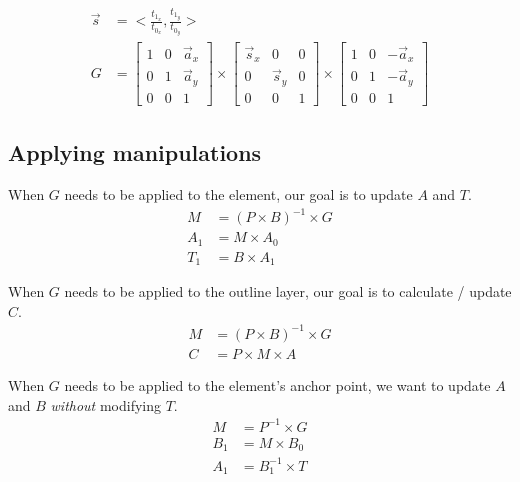 \documentclass[12pt]{article}
\begin{document}
\begin{itemize}
\begin{align}
      \vec s &= <\frac{t_1_x}{t_0_x},\frac{t_1_y}{t_0_y}> \\
      G &= \begin{bmatrix}
        1 & 0 & \vec a_x\\
        0 & 1 & \vec a_y\\
        0 & 0 & 1
      \end{bmatrix} \times
      \begin{bmatrix}
        \vec s_x & 0 & 0\\
        0 & \vec s_y & 0\\
        0 & 0 & 1
      \end{bmatrix} \times
      \begin{bmatrix}
        1 & 0 & -\vec a_x\\
        0 & 1 & -\vec a_y\\
        0 & 0 & 1
      \end{bmatrix}
    \end{align}
\end{itemize}

\subsection{Applying manipulations}

When $G$ needs to be applied to the element, our goal is to update $A$ and $T$.
\begin{align}
  M &= (P \times B)^{-1} \times G \\
  A_1 &= M \times A_0 \\
  T_1 &= B \times A_1
\end{align}

When $G$ needs to be applied to the outline layer, our goal is to calculate / update $C$.
\begin{align}
  M &= (P \times B)^{-1} \times G \\
  C &= P \times M \times A
\end{align}

When $G$ needs to be applied to the element's anchor point, we want to update $A$ and $B$ \emph{without} modifying $T$.
\begin{align}
  M &= P^{-1} \times G \\
  B_1 &= M \times B_0 \\
  A_1 &= B_1^{-1} \times T
\end{align}
\end{document}
